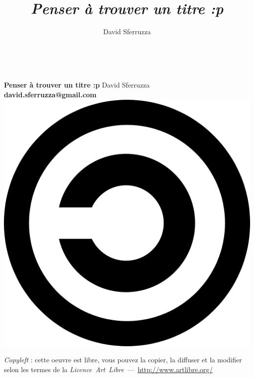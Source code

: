 \documentclass[12pt,a4paper,twoside,openany]{report}
\author{David Sferruzza}
\title{\textit{Penser à trouver un titre :p}}
\date{}
\begin{document}
\maketitle

\begin{titlepage}
~\vfill
\begin{center}
\begin{minipage}[c]{10cm}
\begin{center}
\textbf{Penser à trouver un titre :p}
\linebreak
\linebreak
David Sferruzza\\
\textbf{david.sferruzza@gmail.com}
\linebreak
{}
\linebreak
\linebreak
\linebreak
\includegraphics[scale=.05]{images/copyleft.png} 
\end{center}
\textit{Copyleft} : cette oeuvre est libre, vous pouvez la copier,
la diffuser et la modifier selon les termes de la
\textit{Licence~Art~Libre}~—~\url{http://www.artlibre.org/}
\end{minipage}
\end{center}
\vfill
\end{titlepage}

\tableofcontents






\end{document}
